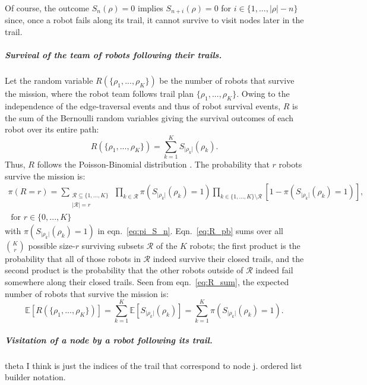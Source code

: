 \documentclass[11pt, oneside]{article}
\begin{document}
Of course, the outcome $S_n(\rho)=0$ implies $S_{n+i}(\rho)=0$ for $i \in \{1, ..., \lvert \rho \rvert - n\}$ since, once a robot fails along its trail, it cannot survive to visit nodes later in the trail.

\subparagraph{Survival of the team of robots following their trails.}
Let the random variable $R(\{\rho_1, ..., \rho_K\})$ be the number of robots that survive the mission, where the robot team follows trail plan $\{\rho_1, ..., \rho_K\}$. Owing to the independence of the edge-traversal events and thus of robot survival events, $R$ is the sum of the Bernoulli random variables giving the survival outcomes of each robot over its entire path:
\begin{equation}
	R(\{\rho_1, ..., \rho_K\})=\sum_{k=1}^K S_{\lvert \rho_k \rvert}(\rho_k). \label{eq:R_sum}
\end{equation}
Thus, $R$ follows the Poisson-Binomial distribution \cite{tang2023poisson}.
The probability that $r$ robots survive the mission is:
\begin{multline}
	\pi(R=r) = \sum_{\substack{\mathcal{R} \subseteq \{1, ..., K\}  \\ \lvert \mathcal{R} \rvert = r} } \,
	\prod_{k \in \mathcal{R}} \pi(S_{\lvert \rho_k \rvert}(\rho_k) = 1)
	\prod_{k \in \{1, ..., K\} \setminus \mathcal{R}} [1- \pi(S_{\lvert \rho_k \rvert}(\rho_k) = 1)], \\ \text{ for } r \in \{0, ..., K\}
	\label{eq:R_pb}
\end{multline} with $ \pi(S_{\lvert \rho_k \rvert}(\rho_k) = 1)$ in eqn.~\ref{eq:pi_S_n}.
Eqn.~\ref{eq:R_pb} sums over all $\binom{K}{r}$ possible size-$r$ surviving subsets $\mathcal{R}$ of the $K$ robots; the first product is the probability that all of those robots in $\mathcal{R}$ indeed survive their closed trails, and the second product is the probability that the other robots outside of $\mathcal{R}$ indeed fail somewhere along their closed trails.
Seen from eqn.~\ref{eq:R_sum}, the expected number of robots that survive the mission is:
\begin{equation}
	\mathbb{E}[R(\{\rho_1, ..., \rho_K\})]=\sum_{k=1}^K \mathbb{E}[S_{\lvert \rho_k \rvert}(\rho_k)] = \sum_{k=1}^K  \pi(S_{\lvert \rho_k \rvert}(\rho_k) = 1).
\end{equation}

\subparagraph{Visitation of a node by a robot following its trail.} 

{\color{red} theta I think is just the indices of the trail that correspond to node j. ordered list builder notation.}
\end{document}

